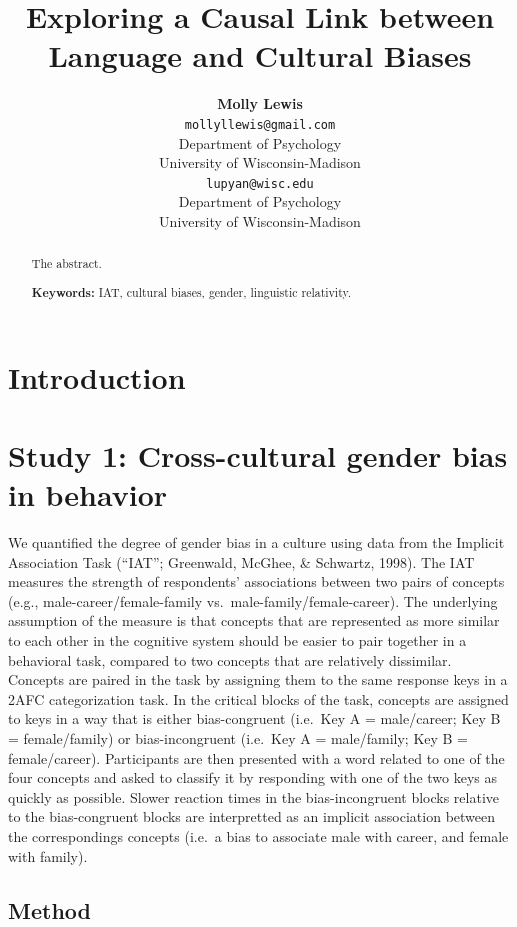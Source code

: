 \documentclass[10pt, letterpaper]{article}
\title{Exploring a Causal Link between Language and Cultural Biases}
\author{{\large \bf Molly Lewis} \\ \texttt{mollyllewis@gmail.com} \\ Department of Psychology  \\ University of Wisconsin-Madison \And {\large \bf Gary Lupyan} \\ \texttt{lupyan@wisc.edu} \\ Department of Psychology  \\ University of Wisconsin-Madison}
\begin{document}
\maketitle

\begin{abstract}
The abstract.

\textbf{Keywords:}
IAT, cultural biases, gender, linguistic relativity.
\end{abstract}

\section{Introduction}\label{introduction}

\section{Study 1: Cross-cultural gender bias in
behavior}\label{study-1-cross-cultural-gender-bias-in-behavior}

We quantified the degree of gender bias in a culture using data from the
Implicit Association Task (``IAT''; Greenwald, McGhee, \& Schwartz,
1998). The IAT measures the strength of respondents' associations
between two pairs of concepts (e.g., male-career/female-family
vs.~male-family/female-career). The underlying assumption of the measure
is that concepts that are represented as more similar to each other in
the cognitive system should be easier to pair together in a behavioral
task, compared to two concepts that are relatively dissimilar. Concepts
are paired in the task by assigning them to the same response keys in a
2AFC categorization task. In the critical blocks of the task, concepts
are assigned to keys in a way that is either bias-congruent (i.e.~Key A
= male/career; Key B = female/family) or bias-incongruent (i.e.~Key A =
male/family; Key B = female/career). Participants are then presented
with a word related to one of the four concepts and asked to classify it
by responding with one of the two keys as quickly as possible. Slower
reaction times in the bias-incongruent blocks relative to the
bias-congruent blocks are interpretted as an implicit association
between the correspondings concepts (i.e.~a bias to associate male with
career, and female with family).

\subsection{Method}\label{method}
\end{document}

